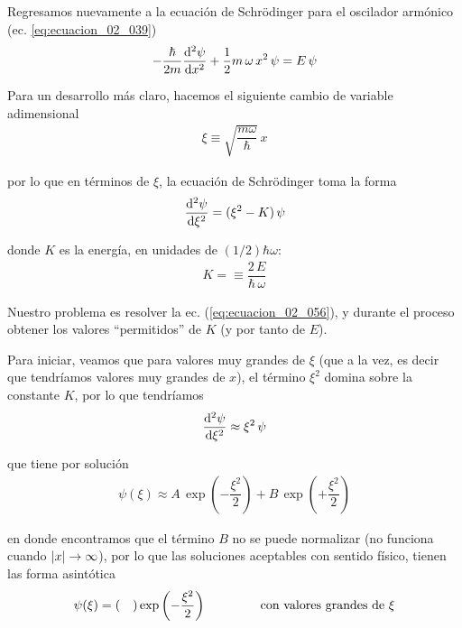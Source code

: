 Regresamos nuevamente a la ecuación de Schrödinger para el oscilador armónico (ec. \ref{eq:ecuacion_02_039})
\begin{align*}
- \dfrac{\hbar}{2 m} \dv[2]{\psi}{x} + \dfrac{1}{2} m \, \omega \, x^{2} \, \psi = E \, \psi  
\end{align*}

Para un desarrollo más claro, hacemos el siguiente cambio de variable adimensional
\begin{align}
\xi \equiv \sqrt{ \dfrac{m \omega}{\hbar}} \, x
\label{eq:ecuacion_02_055}
\end{align}

por lo que en términos de $\xi$, la ecuación de Schrödinger toma la forma
\begin{align}
\dv[2]{\psi}{\xi} = (\xi^{2} - K) \, \psi
\label{eq:ecuacion_02_056}
\end{align}

donde $K$ es la energía, en unidades de $(1/2) \hbar \omega$:
\begin{align}
K = \equiv \dfrac{2 \, E}{\hbar \, \omega}
\label{eq:ecuacion_02_057}
\end{align}

Nuestro problema es resolver la ec. (\ref{eq:ecuacion_02_056}), y durante el proceso obtener los valores \enquote{permitidos} de $K$ (y por tanto de $E$).
\par
Para iniciar, veamos que para valores muy grandes de $\xi$ (que a la vez, es decir que tendríamos valores muy grandes de $x$), el término $\xi^{2}$ domina sobre la constante $K$, por lo que tendríamos
\begin{align}
\dv[2]{\psi}{\xi} \approx \xi^{2} \, \psi
\label{eq:ecuacion_02_058}
\end{align}

que tiene por solución
\begin{align}
\psi (\xi) \approx A \, \exp \left( - \dfrac{\xi^{2}}{2} \right) + B \, \exp \left( + \dfrac{\xi^{2}}{2} \right)
\label{eq:ecuacion_02_059}
\end{align}

en donde encontramos que el término $B$ no se puede normalizar (no funciona cuando $\abs{x} \to \infty$), por lo que las soluciones aceptables con sentido físico, tienen las forma asintótica
\begin{align}
\psi (\xi) = ( \quad ) \exp \left( - \dfrac{\xi^{2}}{2} \right) \hspace{1.5cm} \text{con valores grandes de } \xi
\label{eq:ecuacion_02_060}
\end{align}

